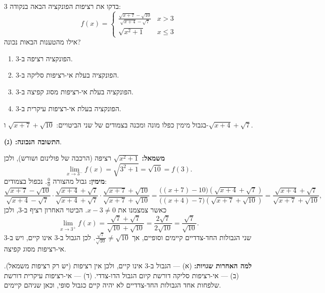 
\begin{question}
בדקו את רציפות הפונקציה הבאה בנקודה 3:
\[
f(x)=\begin{cases}
\frac{\sqrt{x+7}-\sqrt{10}}{\sqrt{x+4}-\sqrt{7}} & x>3\\
\sqrt{x^2+1} & x\le 3
\end{cases}
\]
אילו מהטענות הבאות נכונה?
\begin{enumerate}
  \item הפונקציה רציפה ב-3.
  \item הפונקציה בעלת אי-רציפות סליקה ב-3.
  \item הפונקציה בעלת אי-רציפות מסוג קפיצה ב-3.
  \item הפונקציה בעלת אי-רציפות עיקרית ב-3.
\end{enumerate}
\end{question}

\begin{hint}
בגבול מימין כפלו מונה ומכנה בצמודים של שני הביטויים: $\sqrt{x+7}+\sqrt{10}$ ו-$\sqrt{x+4}+\sqrt7$.
\end{hint}

\begin{solution}
\textbf{התשובה הנכונה: (ג)}.

\textbf{משמאל:} $\sqrt{x^2+1}$ רציפה (הרכבה של פולינום ושורש), ולכן
\[
\lim_{x\to3^-}f(x)=\sqrt{3^2+1}=\sqrt{10}=f(3).
\]
\textbf{מימין:} גבול מהצורה $\frac00$. נכפול בצמודים:
\[
\frac{\sqrt{x+7}-\sqrt{10}}{\sqrt{x+4}-\sqrt7}\cdot\frac{\sqrt{x+4}+\sqrt7}{\sqrt{x+4}+\sqrt7}\cdot\frac{\sqrt{x+7}+\sqrt{10}}{\sqrt{x+7}+\sqrt{10}}
=\frac{\bigl((x+7)-10\bigr)\left(\sqrt{x+4}+\sqrt7\right)}{\bigl((x+4)-7\bigr)\left(\sqrt{x+7}+\sqrt{10}\right)}
=\frac{\sqrt{x+4}+\sqrt7}{\sqrt{x+7}+\sqrt{10}},
\]
כאשר צמצמנו את $x-3\neq0$. הביטוי האחרון רציף ב-3, ולכן
\[
\lim_{x\to3^+}f(x)=\frac{\sqrt7+\sqrt7}{\sqrt{10}+\sqrt{10}}=\frac{2\sqrt7}{2\sqrt{10}}=\frac{\sqrt7}{\sqrt{10}} .
\]
שני הגבולות החד-צדדיים קיימים וסופיים, אך $\frac{\sqrt7}{\sqrt{10}}\neq\sqrt{10}$. לכן הגבול ב-3 אינו קיים, ויש ב-3 אי-רציפות מסוג קפיצה.

\textbf{למה האחרות שגויות:} (א) — הגבול ב-3 אינו קיים, ולכן אין רציפות (יש רק רציפות משמאל). (ב) — אי-רציפות סליקה דורשת קיום הגבול הדו-צדדי. (ד) — אי-רציפות עיקרית דורשת שלפחות אחד הגבולות החד-צדדיים לא יהיה קיים כגבול סופי, וכאן שניהם קיימים.
\end{solution}
